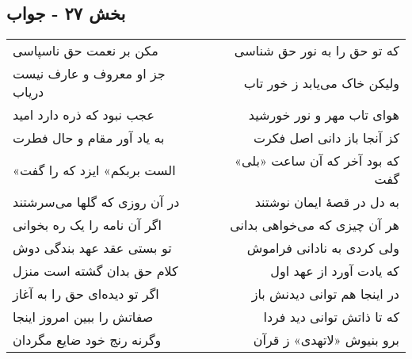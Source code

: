 \begin{center}
\section*{بخش ۲۷ - جواب}
\label{sec:sh027}
\begin{longtable}{l p{0.5cm} r}
مکن بر نعمت حق ناسپاسی
&&
که تو حق را به نور حق شناسی
\\
جز او معروف و عارف نیست دریاب
&&
ولیکن خاک می‌یابد ز خور تاب
\\
عجب نبود که ذره دارد امید
&&
هوای تاب مهر و نور خورشید
\\
به یاد آور مقام و حال فطرت
&&
کز آنجا باز دانی اصل فکرت
\\
«الست بربکم» ایزد که را گفت
&&
که بود آخر که آن ساعت «بلی» گفت
\\
در آن روزی که گلها می‌سرشتند
&&
به دل در قصهٔ ایمان نوشتند
\\
اگر آن نامه را یک ره بخوانی
&&
هر آن چیزی که می‌خواهی بدانی
\\
تو بستی عقد عهد بندگی دوش
&&
ولی کردی به نادانی فراموش
\\
کلام حق بدان گشته است منزل
&&
که یادت آورد از عهد اول
\\
اگر تو دیده‌ای حق را به آغاز
&&
در اینجا هم توانی دیدنش باز
\\
صفاتش را ببین امروز اینجا
&&
که تا ذاتش توانی دید فردا
\\
وگرنه رنج خود ضایع مگردان
&&
برو بنیوش «لاتهدی» ز قرآن
\\
\end{longtable}
\end{center}
